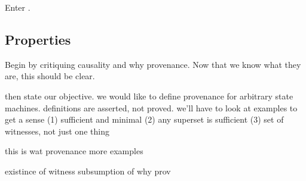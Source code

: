Enter \watprovenance{}.

%


\subsection{\WatProvenance{}}

\subsection{Properties}

Begin by critiquing causality and why provenance. Now that we know what they are, this should be clear.

then state our objective. we would like to define provenance for arbitrary state machines.
definitions are asserted, not proved. we'll have to look at examples to get a sense
(1) sufficient and minimal
(2) any superset is sufficient
(3) set of witnesses, not just one thing

this is wat provenance
more examples

existince of witness
subsumption of why prov
